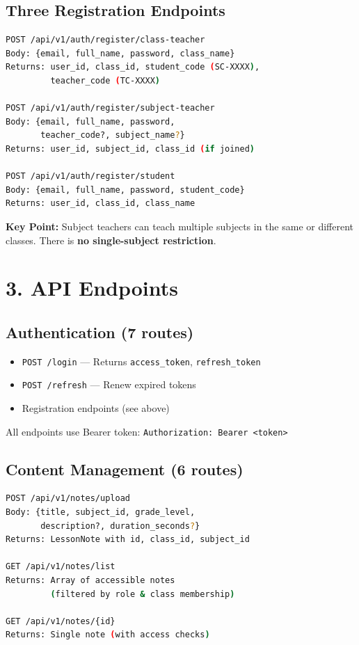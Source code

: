 \documentclass[11pt,a4paper]{article}
\begin{document}
\subsection*{Three Registration Endpoints}

\begin{lstlisting}[language=bash]
POST /api/v1/auth/register/class-teacher
Body: {email, full_name, password, class_name}
Returns: user_id, class_id, student_code (SC-XXXX),
         teacher_code (TC-XXXX)

POST /api/v1/auth/register/subject-teacher
Body: {email, full_name, password, 
       teacher_code?, subject_name?}
Returns: user_id, subject_id, class_id (if joined)

POST /api/v1/auth/register/student
Body: {email, full_name, password, student_code}
Returns: user_id, class_id, class_name
\end{lstlisting}

\textbf{Key Point:} Subject teachers can teach multiple subjects in the same or different classes. There is \textbf{no single-subject restriction}.

\section*{3. API Endpoints}

\subsection*{Authentication (7 routes)}
\begin{itemize}
    \item \texttt{POST /login} — Returns \texttt{access\_token}, \texttt{refresh\_token}
    \item \texttt{POST /refresh} — Renew expired tokens
    \item Registration endpoints (see above)
\end{itemize}

All endpoints use Bearer token: \texttt{Authorization: Bearer <token>}

\subsection*{Content Management (6 routes)}
\begin{lstlisting}[language=bash]
POST /api/v1/notes/upload
Body: {title, subject_id, grade_level, 
       description?, duration_seconds?}
Returns: LessonNote with id, class_id, subject_id

GET /api/v1/notes/list
Returns: Array of accessible notes
         (filtered by role & class membership)

GET /api/v1/notes/{id}
Returns: Single note (with access checks)
\end{lstlisting}
\end{document}
